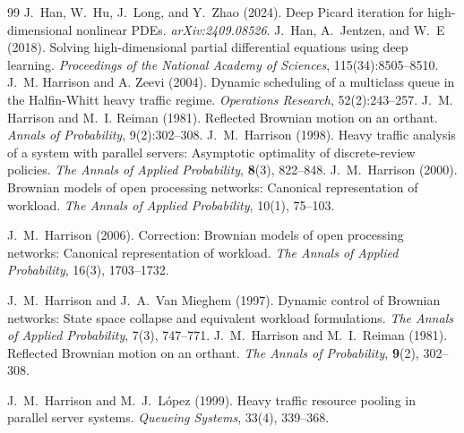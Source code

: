 \documentclass[11pt]{article}
\theoremstyle{definition}
\theoremstyle{plain}
\begin{document}
\begin{singlespace}
\begin{thebibliography}{99}
J.~Han, W.~Hu, J.~Long, and Y.~Zhao (2024).
\newblock Deep Picard iteration for high-dimensional nonlinear PDEs.
\newblock \emph{arXiv:2409.08526}.
   J.~Han, A.~Jentzen, and W.~E (2018). \newblock Solving high-dimensional partial differential equations using deep learning. \newblock \emph{Proceedings of the National Academy of Sciences}, 115(34):8505--8510.
   J.~M. Harrison and A. Zeevi (2004). \newblock Dynamic scheduling of a multiclass queue in the Halfin-Whitt heavy traffic regime. 
  \newblock \emph{Operations Research}, 52(2):243--257.
   J.~M. Harrison and M.~I. Reiman (1981). \newblock Reflected Brownian motion on an orthant. \newblock \emph{Annals of Probability}, 9(2):302--308.
J.~M.~Harrison (1998).
Heavy traffic analysis of a system with parallel servers: Asymptotic optimality of discrete-review policies.
\emph{The Annals of Applied Probability}, \textbf{8}(3), 822--848.
J.~M.~Harrison (2000).
Brownian models of open processing networks: Canonical representation of workload.
\emph{The Annals of Applied Probability}, 10(1), 75--103.

J.~M.~Harrison (2006).
Correction: Brownian models of open processing networks: Canonical representation of workload.
\emph{The Annals of Applied Probability}, 16(3), 1703--1732.

  J.~M.~Harrison and J.~A.~Van Mieghem (1997).
  Dynamic control of Brownian networks: State space collapse and equivalent workload formulations.
  \emph{The Annals of Applied Probability}, 7(3), 747--771.
J.~M.~Harrison and M.~I.~Reiman (1981).
Reflected Brownian motion on an orthant.
\emph{The Annals of Probability}, \textbf{9}(2), 302--308.


J.~M.~Harrison and M.~J.~L\'opez (1999).
Heavy traffic resource pooling in parallel server systems.
\emph{Queueing Systems}, 33(4), 339--368.


\end{thebibliography}
\end{singlespace}
\end{document}
